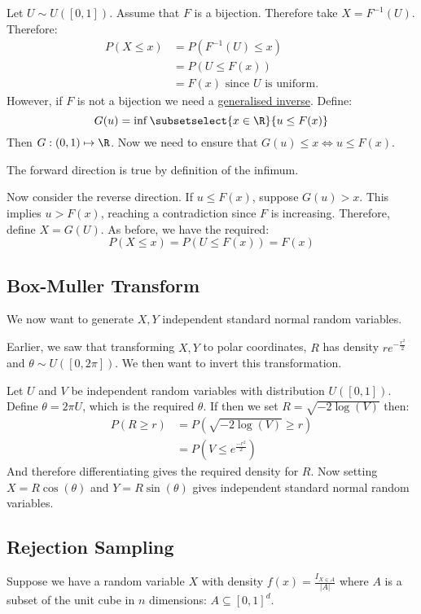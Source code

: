 \documentclass[../Main.tex]{subfiles}
\begin{document}
Let $U \sim U([0, 1])$. Assume that $F$ is a bijection. Therefore take $X = F^{-1}(U)$. Therefore:
\begin{align*}
    P(X \leq x) &= P(F^{-1}(U) \leq x) \\
    &= P(U \leq F(x)) \\
    &= F(x) \text{ since } U \text{ is uniform.}
\end{align*}
However, if $F$ is not a bijection we need a \underline{generalised inverse}. Define:
\begin{equation*}
    G(u) = \inf\subsetselect{x \in \R}{u \leq F(x)}
\end{equation*}
Then $G : (0, 1) \mapsto \R$. Now we need to ensure that $G(u) \leq x \Leftrightarrow u \leq F(x)$.

The forward direction is true by definition of the infimum.

Now consider the reverse direction. If $u \leq F(x)$, suppose $G(u) > x$. This implies $u > F(x)$, reaching a contradiction since $F$ is increasing. Therefore, define $X = G(U)$. As before, we have the required:
\begin{equation*}
    P(X \leq x) = P(U \leq F(x)) = F(x)
\end{equation*}
\subsection{Box-Muller Transform}
We now want to generate $X, Y$ independent standard normal random variables.

Earlier, we saw that transforming $X, Y$ to polar coordinates, $R$ has density $re^{-\frac{r^2}{2}}$ and $\theta \sim U([0, 2\pi])$. We then want to invert this transformation.

Let $U$ and $V$ be independent random variables with distribution $U([0, 1])$. Define $\theta = 2\pi U$, which is the required $\theta$. If then we set $R = \sqrt{-2\log(V)}$ then:
\begin{align*}
    P(R \geq r) &= P(\sqrt{-2\log(V)} \geq r) \\
    &= P(V \leq e^\frac{-r^2}{2})
\end{align*}
And therefore differentiating gives the required density for $R$. Now setting $X = R\cos(\theta)$ and $Y = R\sin(\theta)$ gives independent standard normal random variables.
\subsection{Rejection Sampling}
Suppose we have a random variable $X$ with density $f(x) = \frac{I_{X \in A}}{|A|}$ where $A$ is a subset of the unit cube in $n$ dimensions: $A \subseteq [0, 1]^d$.
\end{document}
